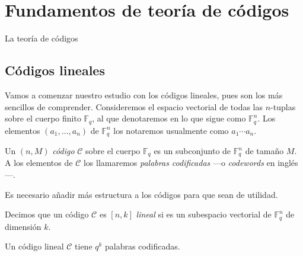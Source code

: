 \chapter{Fundamentos de teoría de códigos}

La teoría de códigos 

\section{Códigos lineales}

Vamos a comenzar nuestro estudio con los códigos lineales, pues son los más sencillos de comprender. Consideremos el espacio vectorial de todas las \(n\)-tuplas sobre el cuerpo finito \(\mathbb F_q\), al que denotaremos en lo que sigue como \(\mathbb F_q^n\). Los elementos \((a_1, \dots, a_n)\) de \(\mathbb F_q^n\) los notaremos usualmente como \(a_1\!\cdots a_n\).

\begin{definition}
  Un \((n, M)\) \textit{código} \(\mathcal C\) sobre el cuerpo \(\mathbb F_q\) es un subconjunto de \(\mathbb F_q^n\) de tamaño \(M\). A los elementos de \(\mathcal C\) los llamaremos \textit{palabras codificadas} —o \textit{codewords} en inglés—.
\end{definition}

Es necesario añadir más estructura a los códigos para que sean de utilidad.

\begin{definition}
  Decimos que un código \(\mathcal C\) es \([n, k]\) \textit{lineal} si es un subespacio vectorial de \(\mathbb F_q^n\) de dimensión \(k\).
\end{definition}

Un código lineal \(\mathcal C\) tiene \(q^k\) palabras codificadas.
